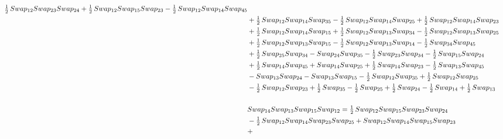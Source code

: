 \documentclass[10pt,a4paper]{amsart}
\begin{document}
\begin{align*}
        \tfrac12\,\textnormal{Swap}_{12} \textnormal{Swap}_{23} \textnormal{Swap}_{24} + \tfrac12\,\textnormal{Swap}_{12} \textnormal{Swap}_{15} \textnormal{Swap}_{23} - \tfrac12\,\textnormal{Swap}_{12} \textnormal{Swap}_{14} \textnormal{Swap}_{45}\\ & + \tfrac12\,\textnormal{Swap}_{12} \textnormal{Swap}_{14} \textnormal{Swap}_{35} -
        \tfrac12\,\textnormal{Swap}_{12} \textnormal{Swap}_{14} \textnormal{Swap}_{25} + \tfrac12\,\textnormal{Swap}_{12} \textnormal{Swap}_{14} \textnormal{Swap}_{23}\\ & + \tfrac12\,\textnormal{Swap}_{12} \textnormal{Swap}_{14} \textnormal{Swap}_{15} + \tfrac12\,\textnormal{Swap}_{12} \textnormal{Swap}_{13} \textnormal{Swap}_{34} -
        \tfrac12\,\textnormal{Swap}_{12} \textnormal{Swap}_{13} \textnormal{Swap}_{25}\\ & + \tfrac12\,\textnormal{Swap}_{12} \textnormal{Swap}_{13} \textnormal{Swap}_{15} - \tfrac12\,\textnormal{Swap}_{12} \textnormal{Swap}_{13} \textnormal{Swap}_{14} - \tfrac12\,\textnormal{Swap}_{34} \textnormal{Swap}_{45}\\ & +
        \tfrac12\,\textnormal{Swap}_{25} \textnormal{Swap}_{34} - \textnormal{Swap}_{24} \textnormal{Swap}_{35} - \tfrac12\,\textnormal{Swap}_{23} \textnormal{Swap}_{34} - \tfrac12\,\textnormal{Swap}_{15} \textnormal{Swap}_{24}\\ & + \tfrac12\,\textnormal{Swap}_{14} \textnormal{Swap}_{45} +
        \textnormal{Swap}_{14} \textnormal{Swap}_{25} + \tfrac12\,\textnormal{Swap}_{14} \textnormal{Swap}_{23} - \tfrac12\,\textnormal{Swap}_{13} \textnormal{Swap}_{45}\\ & - \textnormal{Swap}_{13} \textnormal{Swap}_{24} - \textnormal{Swap}_{13} \textnormal{Swap}_{15} - \tfrac12\,\textnormal{Swap}_{12} \textnormal{Swap}_{35} +
        \tfrac12\,\textnormal{Swap}_{12} \textnormal{Swap}_{25}\\ & - \tfrac12\,\textnormal{Swap}_{12} \textnormal{Swap}_{23} + \tfrac12\,\textnormal{Swap}_{35} - \tfrac12\,\textnormal{Swap}_{25} + \tfrac12\,\textnormal{Swap}_{24} - \tfrac12\,\textnormal{Swap}_{14} +
        \tfrac12\,\textnormal{Swap}_{13}\\
        \\
        &\textnormal{Swap}_{14}   \textnormal{Swap}_{13}   \textnormal{Swap}_{15}   \textnormal{Swap}_{12} =  \tfrac12\,\textnormal{Swap}_{12} \textnormal{Swap}_{15} \textnormal{Swap}_{23} \textnormal{Swap}_{24}\\ & - \tfrac12\,\textnormal{Swap}_{12} \textnormal{Swap}_{14} \textnormal{Swap}_{23} \textnormal{Swap}_{25} + \textnormal{Swap}_{12} \textnormal{Swap}_{14} \textnormal{Swap}_{15} \textnormal{Swap}_{23}\\ & +

\end{align*}
\end{document}
